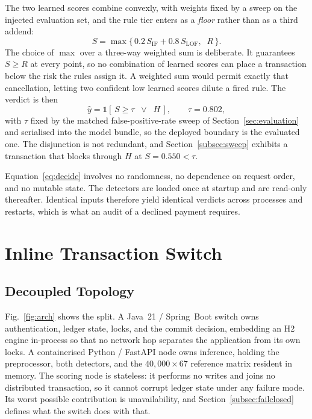 \documentclass[conference]{IEEEtran}
\begin{document}
The two learned scores combine convexly, with weights fixed by a sweep
on the injected evaluation set, and the rule tier enters as a
\emph{floor} rather than as a third addend:
\begin{equation}
S = \max\big\{\,0.2\,S_{\mathrm{IF}} + 0.8\,S_{\mathrm{LOF}},\;\;
R \,\big\} .
\label{eq:fused}
\end{equation}
The choice of $\max$ over a three-way weighted sum is deliberate. It
guarantees $S \geq R$ at every point, so no combination of learned
scores can place a transaction below the risk the rules assign it. A
weighted sum would permit exactly that cancellation, letting two
confident low learned scores dilute a fired rule. The verdict is then
\begin{equation}
\hat{y} = \mathbb{1}\!\left[\, S \geq \tau \;\;\vee\;\; H \,\right],
\qquad \tau = 0.802 ,
\label{eq:decide}
\end{equation}
with $\tau$ fixed by the matched false-positive-rate sweep of
Section~\ref{sec:evaluation} and serialised into the model bundle, so
the deployed boundary is the evaluated one. The disjunction is not
redundant, and Section~\ref{subsec:sweep} exhibits a transaction that
blocks through $H$ at $S = 0.550 < \tau$.

Equation~\eqref{eq:decide} involves no randomness, no dependence on
request order, and no mutable state. The detectors are loaded once at
startup and are read-only thereafter. Identical inputs therefore yield
identical verdicts across processes and restarts, which is what an
audit of a declined payment requires.

\section{Inline Transaction Switch}
\label{sec:architecture}

\subsection{Decoupled Topology}

Fig.~\ref{fig:arch} shows the split. A Java~21 / Spring~Boot switch
owns authentication, ledger state, locks, and the commit decision,
embedding an H2 engine in-process so that no network hop separates the
application from its own locks. A containerised Python / FastAPI node
owns inference, holding the preprocessor, both detectors, and the
$40{,}000 \times 67$ reference matrix resident in memory. The scoring
node is stateless: it performs no writes and joins no distributed
transaction, so it cannot corrupt ledger state under any failure mode.
Its worst possible contribution is unavailability, and
Section~\ref{subsec:failclosed} defines what the switch does with that.
\end{document}
